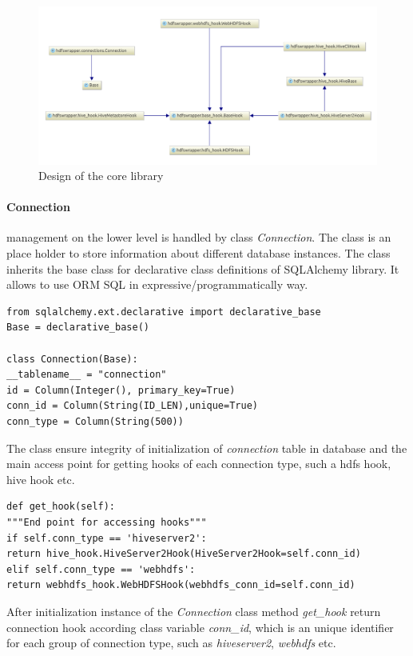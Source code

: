 \documentclass[a4paper,12pt,oneside]{report}
\begin{document}
	\begin{figure}[!htbp]
		\centering
		\includegraphics[width=1\textwidth]{./img/diag1_small.pdf}
		\caption[Core diagram]{\centering Design of the core library }
	\end{figure} 
	
	\paragraph{Connection} management on the  lower level is handled by  class
	\textit{Connection}. The class is an place holder to store information about
	different database instances. The class inherits the  base class for declarative
	class definitions of SQLAlchemy library. 
	It allows to use ORM SQL in expressive/programmatically way.  
	\begin{footnotesize}
		\begin{lstlisting}[style=python]
from sqlalchemy.ext.declarative import declarative_base
Base = declarative_base()

class Connection(Base):
__tablename__ = "connection"
id = Column(Integer(), primary_key=True)
conn_id = Column(String(ID_LEN),unique=True)
conn_type = Column(String(500))
		\end{lstlisting}
	\end{footnotesize}
	The class ensure integrity of initialization of \textit{connection} table in
	database and the main access point for getting hooks of each connection type,
	such a hdfs hook, hive hook etc. 
	\begin{footnotesize}
		\begin{lstlisting}[style=python]
def get_hook(self):
"""End point for accessing hooks"""
if self.conn_type == 'hiveserver2':
return hive_hook.HiveServer2Hook(HiveServer2Hook=self.conn_id)
elif self.conn_type == 'webhdfs':
return webhdfs_hook.WebHDFSHook(webhdfs_conn_id=self.conn_id)
		\end{lstlisting}
	\end{footnotesize}
	After initialization instance of the \textit{Connection} class method
	\textit{get\_hook} return connection hook according class variable
	\textit{conn\_id}, which is an unique identifier for each group of connection
	type, such as \textit{hiveserver2}, \textit{webhdfs} etc.
	
\end{document}
